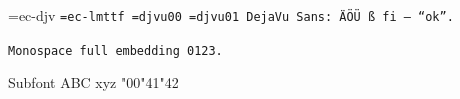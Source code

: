 \font\dj=ec-djv \font\tt=ec-lmttf \font\su=djvu00 \font\sv=djvu01
\dj DejaVu Sans: \"A\"O\"U \ss\ fi --- ``ok''.
\par\tt Monospace full embedding 0123.
\par\su Subfont ABC xyz \sv \char"00\char"41\char"42
\bye
